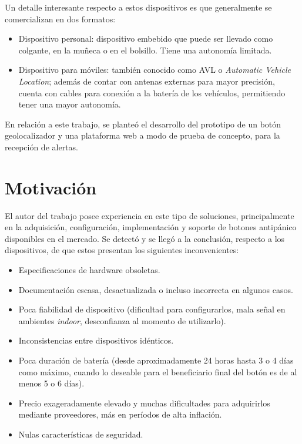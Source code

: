 Un detalle interesante respecto a estos dispositivos es que generalmente se comercializan en dos formatos:

\begin{itemize}
\item Dispositivo personal: dispositivo embebido que puede ser llevado como colgante, en la muñeca o en el bolsillo. Tiene una autonomía limitada.
\item Dispositivo para móviles: también conocido como AVL o \textit{Automatic Vehicle Location}; además de contar con antenas externas para mayor precisión, cuenta con cables para conexión a la batería de los vehículos, permitiendo tener una mayor autonomía.
\end{itemize}


En relación a este trabajo, se planteó el desarrollo del prototipo de un botón geolocalizador y una plataforma web a modo de prueba de concepto, para la recepción de alertas.


\section{Motivación}

El autor del trabajo posee experiencia en este tipo de soluciones, principalmente en la adquisición, configuración, implementación y soporte de botones antipánico disponibles en el mercado. Se detectó y se llegó a la conclusión, respecto a los dispositivos, de que estos presentan los siguientes inconvenientes:

\begin{itemize}
\item Especificaciones de hardware obsoletas.
\item Documentación escasa, desactualizada o incluso incorrecta en algunos casos.
\item Poca fiabilidad de dispositivo (dificultad para configurarlos, mala señal en ambientes \textit{indoor}, desconfianza al momento de utilizarlo).
\item Inconsistencias entre dispositivos idénticos.
\item Poca duración de batería (desde aproximadamente 24 horas hasta 3 o 4 días como máximo, cuando lo deseable para el beneficiario final del botón es de al menos 5 o 6 días).
\item Precio exageradamente elevado y muchas dificultades para adquirirlos mediante proveedores, más en períodos de alta inflación.
\item Nulas características de seguridad.
\end{itemize}

